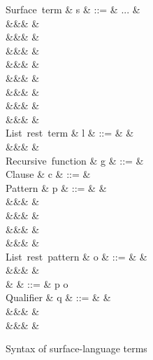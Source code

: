 \begin{figure}[H]
\begin{syntaxfig}
\mbox{Surface term}
&
s
&
::=
&
...
&
\\
&&&
&
\\
&&&
&
\\
&&&
&
\\
&&&
&
\\
&&&
&
\\
&&&
&
\\
&&&
&
\\
&&&
&
\\[2mm]

\mbox{List rest term}
&
l
&
::=
&
\annListEnd{\alpha}
&
\\
&&&
&
\\[2mm]

\mbox{Recursive function}
&
g
&
::=
&
\\[2mm]

\mbox{Clause}
&
c
&
::=
&
\\[2mm]

\mbox{Pattern}
&
p
&
::=
&
&
\\
&&&
\pattNil
&
\\
&&&
&
\\
&&&
&
\\
&&&
&
\\[2mm]

\mbox{List rest pattern}
&
o
&
::=
&
\pattListEnd
&
\\
&&&
&
\\[2mm]

&
\pi
&
::=
&
p \mid o
\\[2mm]

\mbox{Qualifier}
&
q
&
::=
&
&
\\
&&&
&
\\
&&&
&
\\[2mm]

\end{syntaxfig}
\caption{Syntax of surface-language terms}
\end{figure}
